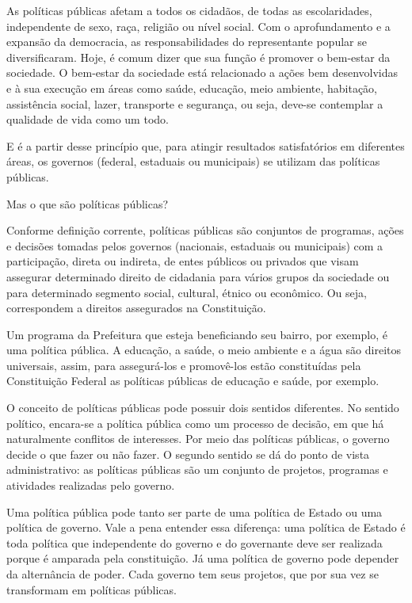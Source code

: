 \documentclass[
   article,       
   12pt,          
   oneside,       
   a4paper,       
   english,       
   brazil,        
   sumario=tradicional
   ]{abntex2}
\begin{document}
As políticas públicas afetam a todos os cidadãos, de todas as escolaridades, independente de sexo, raça, religião ou nível social. Com o aprofundamento e a expansão da democracia, as responsabilidades do representante popular se diversificaram. Hoje, é comum dizer que sua função é promover o bem-estar da sociedade. O bem-estar da sociedade está relacionado a ações bem desenvolvidas e à sua execução em áreas como saúde, educação, meio ambiente, habitação, assistência social, lazer, transporte e segurança, ou seja, deve-se contemplar a qualidade de vida como um todo.

E é a partir desse princípio que, para atingir resultados satisfatórios em diferentes áreas, os governos (federal, estaduais ou municipais) se utilizam das políticas públicas.

Mas o que são políticas públicas?

Conforme definição corrente, políticas públicas são conjuntos de programas, ações e decisões tomadas pelos governos (nacionais, estaduais ou municipais) com a participação, direta ou indireta, de entes públicos ou privados que visam assegurar determinado direito de cidadania para vários grupos da sociedade ou para determinado segmento social, cultural, étnico ou econômico. Ou seja, correspondem a direitos assegurados na Constituição.

Um programa da Prefeitura que esteja beneficiando seu bairro, por exemplo, é uma política pública. A educação, a saúde, o meio ambiente e a água são direitos universais, assim, para assegurá-los e promovê-los estão constituídas pela Constituição Federal as políticas públicas de educação e saúde, por exemplo.

O conceito de políticas públicas pode possuir dois sentidos diferentes. No sentido político, encara-se a política pública como um processo de decisão, em que há naturalmente conflitos de interesses. Por meio das políticas públicas, o governo decide o que fazer ou não fazer. O segundo sentido se dá do ponto de vista administrativo: as políticas públicas são um conjunto de projetos, programas e atividades realizadas pelo governo.

Uma política pública pode tanto ser parte de uma política de Estado ou uma política de governo. Vale a pena entender essa diferença: uma política de Estado é toda política que independente do governo e do governante deve ser realizada porque é amparada pela constituição. Já uma política de governo pode depender da alternância de poder. Cada governo tem seus projetos, que por sua vez se transformam em políticas públicas.
\end{document}
